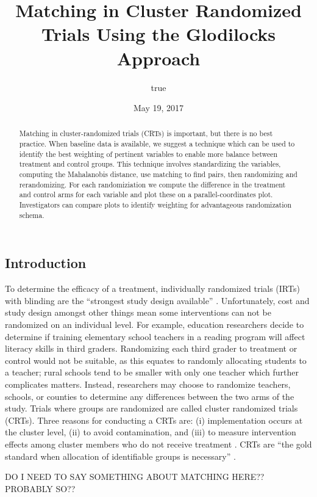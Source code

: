\documentclass[]{sagej}
\title{Matching in Cluster Randomized Trials Using the Glodilocks Approach}
\author{true}
\date{May 19, 2017}
\begin{document}
\maketitle
\begin{abstract}
Matching in cluster-randomized trials (CRTs) is important, but there is
no best practice. When baseline data is available, we suggest a
technique which can be used to identify the best weighting of pertinent
variables to enable more balance between treatment and control groups.
This technique involves standardizing the variables, computing the
Mahalanobis distance, use matching to find pairs, then randomizing and
rerandomizing. For each randomiziation we compute the difference in the
treatment and control arms for each variable and plot these on a
parallel-coordinates plot. Investigators can compare plots to identify
weighting for advantageous randomization schema.
\end{abstract}

\subsection{Introduction}\label{introduction}

To determine the efficacy of a treatment, individually randomized trials
(IRTs) with blinding are the ``strongest study design available''
\citep{gatsonis2017methods}. Unfortunately, cost and study design
amongst other things mean some interventions can not be randomized on an
individual level. For example, education researchers decide to determine
if training elementary school teachers in a reading program will affect
literacy skills in third graders. Randomizing each third grader to
treatment or control would not be suitable, as this equates to randomly
allocating students to a teacher; rural schools tend to be smaller with
only one teacher which further complicates matters. Instead, researchers
may choose to randomize teachers, schools, or counties to determine any
differences between the two arms of the study. Trials where groups are
randomized are called cluster randomized trials (CRTs). Three reasons
for conducting a CRTs are: (i) implementation occurs at the cluster
level, (ii) to avoid contamination, and (iii) to measure intervention
effects among cluster members who do not receive treatment
\citep{balzer2012match, CRTrials2009}. CRTs are ``the gold standard when
allocation of identifiable groups is necessary''
\citep{murray2004design}.

DO I NEED TO SAY SOMETHING ABOUT MATCHING HERE?? PROBABLY SO??
\end{document}
